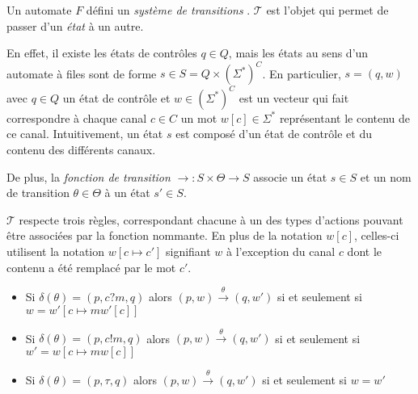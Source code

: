 Un automate $F$ défini un \emph{système de transitions} \tsys. $\mathcal{T}$ est l'objet qui permet de passer d'un \emph{état} à un autre.

En effet, il existe les états de contrôles $q\in Q$, mais les états au sens d'un automate à files sont de forme $s \in S=Q\times(\Sigma^*)^C$. En particulier, $s=(q,w)$ avec $q\in Q$ un état de contrôle et $w\in (\Sigma^*)^C$ est un vecteur qui fait correspondre à chaque canal $c\in C$ un mot $w[c] \in \Sigma^*$ représentant le contenu de ce canal. Intuitivement, un état $s$ est composé d'un état de contrôle et du contenu des différents canaux.

De plus, la \emph{fonction de transition} $\rightarrow:S\times\Theta\rightarrow S$ associe un état $s\in S$ et un nom de transition $\theta\in\Theta$ à un état $s'\in S$.

$\mathcal{T}$ respecte trois règles, correspondant chacune à un des types d'actions pouvant être associées par la fonction nommante. En plus de la notation $w[c]$, celles-ci utilisent la notation $w[c\mapsto c']$ signifiant $w$ à l'exception du canal $c$ dont le contenu a été remplacé par le mot $c'$.
\begin{itemize}
  \item Si $\delta(\theta)=(p,c?m,q)$ alors $(p,w)\xrightarrow{\theta}(q,w')$ si et seulement si $w=w'[c\mapsto mw'[c]]$
  \item Si $\delta(\theta)=(p,c!m,q)$ alors $(p,w)\xrightarrow{\theta}(q,w')$ si et seulement si $w'=w[c\mapsto mw[c]]$
  \item Si $\delta(\theta)=(p,\tau,q)$ alors $(p,w)\xrightarrow{\theta}(q,w')$ si et seulement si $w=w'$
\end{itemize}

